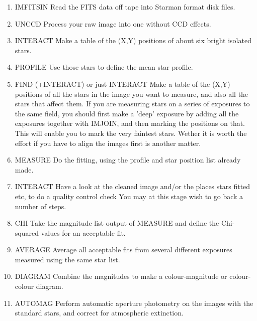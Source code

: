  \begin{enumerate}

 \item IMFITSIN \newline
       Read the FITS data off tape into Starman format disk files.

 \item UNCCD \newline
       Process your raw image into one without CCD effects.

 \item INTERACT \newline    Make a table of the (X,Y) positions of about six bright
                isolated stars.

 \item PROFILE \newline    Use those stars to define the mean star profile.

 \item FIND (+INTERACT) or just INTERACT \newline
        Make a table of the (X,Y) positions of all the stars in the image
        you want to measure, and also all the stars that
        affect them. If you are measuring stars on a series
        of exposures to the same field, you should first make a
        'deep' exposure by adding all the exposures together
        with IMJOIN, and then marking the positions on that.
        This will enable you to mark the very faintest stars.
        Wether it is worth the effort if you have to align the
        images first is another matter.
 
 \item MEASURE   \newline Do the fitting, using the profile and star position
                list already made.
 
 \item INTERACT    \newline Have a look at the cleaned image and/or the places
          stars fitted etc, to do a quality control check
          You may at this stage wish to go back a number of steps.
 
 \item  CHI \newline Take the magnitude list output of MEASURE and define
                the Chi-squared values for an acceptable fit.
 
 \item AVERAGE     \newline Average all acceptable fits from several different
                exposures measured using the same star list.
 
 \item DIAGRAM  \newline   Combine the magnitudes to make a colour-magnitude
                or colour-colour diagram.

 \item AUTOMAG \newline Perform automatic aperture photometry on the images
               with the standard stars, and correct for atmospheric 
               extinction.

\end{enumerate}
 

